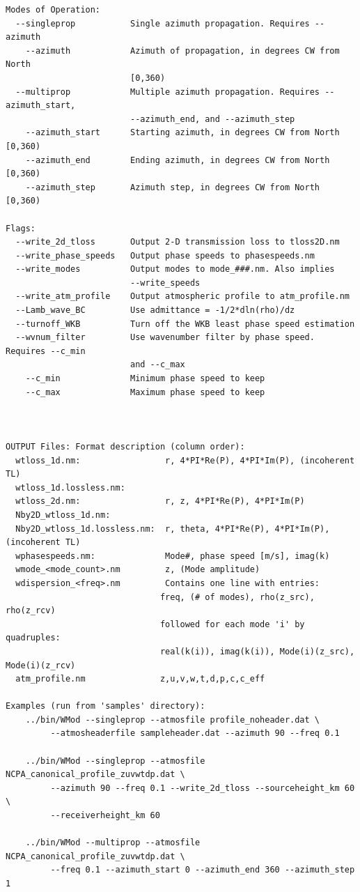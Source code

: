 \begin{verbatim}
Modes of Operation:
  --singleprop           Single azimuth propagation. Requires --azimuth
    --azimuth            Azimuth of propagation, in degrees CW from North
                         [0,360)
  --multiprop            Multiple azimuth propagation. Requires --azimuth_start,
                         --azimuth_end, and --azimuth_step
    --azimuth_start      Starting azimuth, in degrees CW from North [0,360)
    --azimuth_end        Ending azimuth, in degrees CW from North [0,360)
    --azimuth_step       Azimuth step, in degrees CW from North [0,360)

Flags:
  --write_2d_tloss       Output 2-D transmission loss to tloss2D.nm
  --write_phase_speeds   Output phase speeds to phasespeeds.nm
  --write_modes          Output modes to mode_###.nm. Also implies
                         --write_speeds
  --write_atm_profile    Output atmospheric profile to atm_profile.nm
  --Lamb_wave_BC         Use admittance = -1/2*dln(rho)/dz
  --turnoff_WKB          Turn off the WKB least phase speed estimation
  --wvnum_filter         Use wavenumber filter by phase speed. Requires --c_min
                         and --c_max
    --c_min              Minimum phase speed to keep
    --c_max              Maximum phase speed to keep



OUTPUT Files: Format description (column order):
  wtloss_1d.nm:                 r, 4*PI*Re(P), 4*PI*Im(P), (incoherent TL)
  wtloss_1d.lossless.nm:
  wtloss_2d.nm:                 r, z, 4*PI*Re(P), 4*PI*Im(P)
  Nby2D_wtloss_1d.nm:
  Nby2D_wtloss_1d.lossless.nm:  r, theta, 4*PI*Re(P), 4*PI*Im(P), (incoherent TL)
  wphasespeeds.nm:              Mode#, phase speed [m/s], imag(k)
  wmode_<mode_count>.nm         z, (Mode amplitude)
  wdispersion_<freq>.nm         Contains one line with entries:
                               freq, (# of modes), rho(z_src), rho(z_rcv)
                               followed for each mode 'i' by quadruples:
                               real(k(i)), imag(k(i)), Mode(i)(z_src), Mode(i)(z_rcv)
  atm_profile.nm               z,u,v,w,t,d,p,c,c_eff

Examples (run from 'samples' directory):
    ../bin/WMod --singleprop --atmosfile profile_noheader.dat \
         --atmosheaderfile sampleheader.dat --azimuth 90 --freq 0.1

    ../bin/WMod --singleprop --atmosfile NCPA_canonical_profile_zuvwtdp.dat \
         --azimuth 90 --freq 0.1 --write_2d_tloss --sourceheight_km 60 \
         --receiverheight_km 60

    ../bin/WMod --multiprop --atmosfile NCPA_canonical_profile_zuvwtdp.dat \
         --freq 0.1 --azimuth_start 0 --azimuth_end 360 --azimuth_step 1

\end{verbatim}

